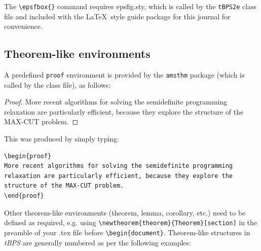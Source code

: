 \documentclass{tBPS2e}
\theoremstyle{plain}
\theoremstyle{definition}
\theoremstyle{remark}
\begin{document}
The \verb"\epsfbox{}" command requires epsfig.sty, which is called by the \texttt{tBPS2e} class file and included with the \LaTeX\ style guide package for this journal for convenience.


\subsection{Theorem-like environments}

A predefined \verb"proof" environment is provided by the \texttt{amsthm} package (which is called by the class file), as follows:

\begin{proof}
More recent algorithms for solving the semidefinite programming
relaxation are particularly efficient, because they explore the
structure of the MAX-CUT problem.
\end{proof}
\noindent This was produced by simply typing:
\begin{verbatim}
\begin{proof}
More recent algorithms for solving the semidefinite programming
relaxation are particularly efficient, because they explore the
structure of the MAX-CUT problem.
\end{proof}
\end{verbatim}
Other theorem-like environments (theorem, lemma, corollary, etc.) need to be defined as required, e.g. using \verb"\newtheorem{theorem}{Theorem}[section]"
in the preamble of your .tex file before \verb"\begin{document}". Theorem-like structures in \textit{tBPS} are generally numbered as per the following examples:
\end{document}

